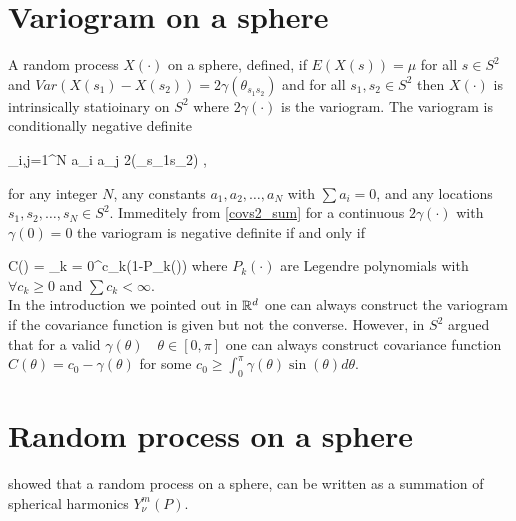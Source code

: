 	\section{Variogram on a sphere}
	
	
	A random process $X(\cdot)$ on a sphere, \cite{HuangZhangRobeson2011} defined, if $E(X(s))=\mu$ for all $s\in S^2$ and $Var(X(s_1)-X(s_2)) = 2\gamma(\theta_{s_1s_2})$ and for all $s_1, s_2 \in S^2$ then $X(\cdot)$ is intrinsically statioinary on $S^2$ where $2\gamma(\cdot)$ is the variogram. The variogram is conditionally negative definite
	
	\beq
	\sum_{i,j=1}^{N} a_i a_j 2\gamma(\theta_{s_1s_2}) ,
	\eeq
	
	for any integer $N$, any constants $a_1, a_2, \ldots, a_N$ with $\sum a_i = 0$, and any locations $s_1, s_2, \ldots, s_N \in S^2$. Immeditely from \ref{covs2_sum} for a continuous $2\gamma(\cdot)$ with $\gamma(0)=0$ the variogram is negative definite if and only if 
	
	\beq \label{covs2_sum}
	C(\theta) = \sum_{k = 0}^\infty c_k(1-P_k(\cos\theta))
	\eeq
	where $P_{k}(\cdot)$ are Legendre polynomials with $\forall c_k\ge 0$ and $\sum c_k < \infty$. \\
	
	In the introduction we pointed out in $\mathbb{R}^d$ one can always construct the variogram if the covariance function is given but not the converse. However, in $S^2$ \cite{Yaglom1961} argued that for a valid $\gamma(\theta) \quad \theta \in [0,\pi]$ one can always construct covariance function $C(\theta)=c_0-\gamma(\theta)$ for some $c_0 \ge \int_0^{\pi} \gamma(\theta)\sin(\theta)d\theta$. 
	
	\section{Random process on a sphere}
	
	\cite{Jones1963} showed that a random process on a sphere, can be written as a summation of spherical harmonics $Y_{\nu}^m(P)$. 
	
	
